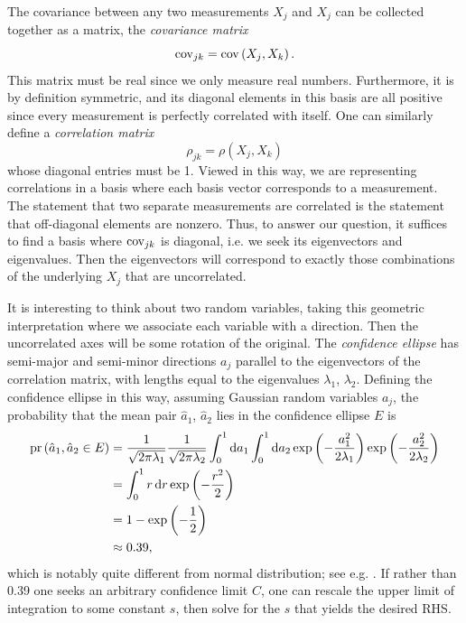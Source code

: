 The covariance between any two measurements $X_j$ and $X_j$ can be
collected together as a matrix, the 
{\it covariance matrix}
\begin{equation}
\operatorname{cov}_{jk}=\operatorname{cov}\left(X_j,X_k\right).
\end{equation}
This matrix must be real since we only measure real numbers.
Furthermore, it is by definition symmetric, and its diagonal
elements in this basis are all positive since every measurement
is perfectly correlated with itself. One can similarly define
a {\it correlation matrix}
\begin{equation}
\rho_{jk}=\rho\left(X_j,X_k\right)
\end{equation}
whose diagonal entries must be 1. Viewed in this way, we are
representing correlations in a basis where each basis vector
corresponds to a measurement. The statement that two separate
measurements are correlated is the statement that off-diagonal
elements are nonzero.
Thus, to answer our question, it suffices to find a basis where
$\operatorname{cov}_{jk}$ is diagonal, i.e. we seek its eigenvectors and eigenvalues.
Then the eigenvectors will correspond to exactly those combinations
of the underlying $X_j$ that are uncorrelated.

It is interesting to think about two random variables, taking this
geometric interpretation where we associate each variable with
a direction. Then the uncorrelated axes will be some rotation
of the original. The {\it confidence ellipse}
has semi-major and semi-minor directions $a_j$ parallel to the
eigenvectors of the correlation matrix, with lengths equal
to the eigenvalues $\lambda_1$, $\lambda_2$. 
Defining the confidence ellipse in this way,
assuming Gaussian random variables $a_j$, the probability
that the mean pair $\hat{a}_1$, $\hat{a}_2$ lies
in the confidence ellipse $E$ is
\begin{equation}\begin{aligned}\label{eq:confidenceInt}
\pr{\hat{a}_1,\hat{a}_2\in E} & =\frac{1}{\sqrt{2 \pi \lambda_1}} \frac{1}{\sqrt{2 \pi \lambda_2}}
\int_0^1 \dd{a_1}\int_0^1\dd{a_2} \exp \left(-\frac{a_1^2}{2 \lambda_1}\right) \exp \left(-\frac{a_2^2}{2 \lambda_2}\right) \\
& = \int_0^1 r \dd{r} \exp \left(-\frac{r^2}{2}\right)\\
&=1-\exp \left(-\frac{1}{2}\right)\\
&\approx0.39,
\end{aligned}\end{equation}
which is notably quite different from  normal distribution;
see e.g. . If rather than 0.39 one seeks
an arbitrary confidence limit $C$, one can rescale the 
upper limit of integration to some constant $s$, 
then solve for the $s$ that yields
the desired RHS.



